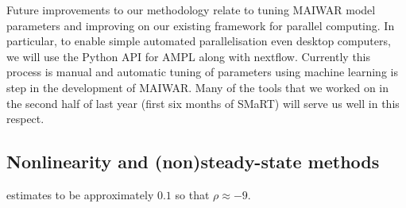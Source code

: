 \documentclass[12pt,a4paper,twoside, draft]{article}
\begin{document}
Future improvements to our methodology relate to tuning MAIWAR model
parameters and improving on our existing framework for parallel computing.
In particular, to enable simple automated parallelisation even desktop
computers, we will use the Python API for AMPL along with nextflow.
Currently this process is manual and automatic tuning of parameters using
machine learning is  step in the development of MAIWAR.
Many of the tools that we worked on in the second half of last year (first six
months of SMaRT) will serve us well in this respect.

\subsection{Nonlinearity and (non)steady-state methods}

\citet{Atalay-Sectoral_shocks} estimates to be approximately $0.1$ so that
$\rho \approx -9$.

 
\end{document}
